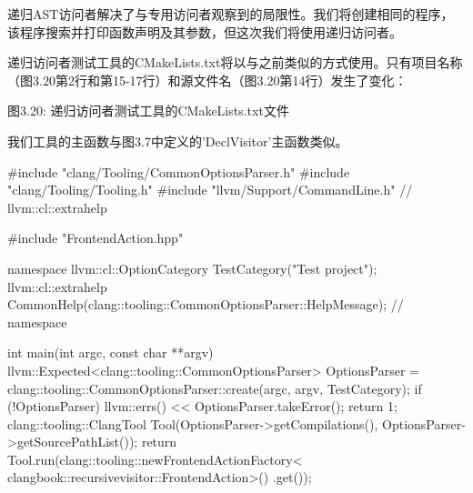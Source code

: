 递归AST访问者解决了与专用访问者观察到的局限性。我们将创建相同的程序，该程序搜索并打印函数声明及其参数，但这次我们将使用递归访问者。

递归访问者测试工具的CMakeLists.txt将以与之前类似的方式使用。只有项目名称（图3.20第2行和第15-17行）和源文件名（图3.20第14行）发生了变化：


\begin{center}
图3.20: 递归访问者测试工具的CMakeLists.txt文件
\end{center}

我们工具的主函数与图3.7中定义的'DeclVisitor'主函数类似。

\begin{cpp}
#include "clang/Tooling/CommonOptionsParser.h"
#include "clang/Tooling/Tooling.h"
#include "llvm/Support/CommandLine.h" // llvm::cl::extrahelp

#include "FrontendAction.hpp"

namespace {
llvm::cl::OptionCategory TestCategory("Test project");
llvm::cl::extrahelp
  CommonHelp(clang::tooling::CommonOptionsParser::HelpMessage);
} // namespace

int main(int argc, const char **argv) {
  llvm::Expected<clang::tooling::CommonOptionsParser> OptionsParser =
    clang::tooling::CommonOptionsParser::create(argc, argv, TestCategory);
  if (!OptionsParser) {
    llvm::errs() << OptionsParser.takeError();
    return 1;
  }
  clang::tooling::ClangTool Tool(OptionsParser->getCompilations(),
                                 OptionsParser->getSourcePathList());
  return Tool.run(clang::tooling::newFrontendActionFactory<
                    clangbook::recursivevisitor::FrontendAction>()
                    .get());
}
\end{cpp}

